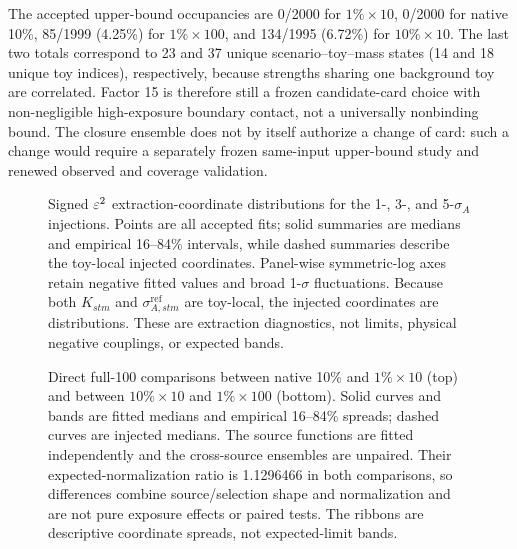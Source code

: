 The accepted upper-bound occupancies are 0/2000 for $1\%\times10$, 0/2000 for
native 10\%, 85/1999 (4.25\%) for $1\%\times100$, and 134/1995 (6.72\%) for
$10\%\times10$.  The last two totals correspond to 23 and 37 unique
scenario--toy--mass states (14 and 18 unique toy indices), respectively, because
strengths sharing one background toy are correlated.  Factor 15 is therefore still a frozen candidate-card choice with
non-negligible high-exposure boundary contact, not a universally nonbinding bound.
The closure ensemble does not by itself authorize a change of card: such a change
would require a separately frozen same-input upper-bound study and renewed observed
and coverage validation.

\begin{figure}[p]
\centering
{}
\caption{Signed $\varepsilon^2$ extraction-coordinate distributions for the 1-, 3-, and
5-$\sigma_A$ injections.  Points are all accepted fits; solid summaries are medians
and empirical 16--84\% intervals, while dashed summaries describe the toy-local
injected coordinates.  Panel-wise symmetric-log axes retain negative fitted values
and broad 1-$\sigma$ fluctuations.  Because both $K_{stm}$ and
$\sigma^{\mathrm{ref}}_{A,stm}$ are toy-local, the injected coordinates are
distributions.  These are extraction diagnostics, not limits, physical negative
couplings, or expected bands.}
\label{fig:v4p6-eps2-distributions}
\end{figure}

\begin{figure}[p]
\centering
{}
\caption{Direct full-100 comparisons between native 10\% and $1\%\times10$ (top)
and between $10\%\times10$ and $1\%\times100$ (bottom).  Solid curves and bands are
fitted medians and empirical 16--84\% spreads; dashed curves are injected medians.
The source functions are fitted independently and the cross-source ensembles are
unpaired.  Their expected-normalization ratio is 1.1296466 in both comparisons, so
differences combine source/selection shape and normalization and are not pure exposure
effects or paired tests.  The ribbons are descriptive coordinate spreads, not
expected-limit bands.}
\label{fig:v4p6-direct-eps2-comparisons}
\end{figure}


